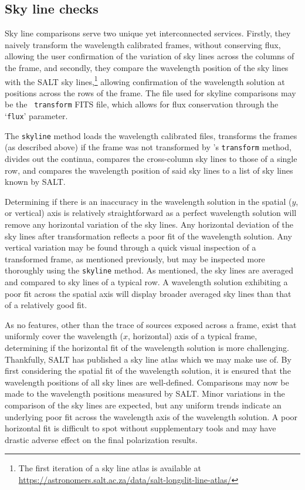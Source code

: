 \subsection{Sky line checks}\label{subsec:stops_skyline}


Sky line comparisons serve two unique yet interconnected services. Firstly, they naively transform the wavelength calibrated frames, without conserving flux, allowing the user confirmation of the variation of sky lines across the columns of the frame, and secondly, they compare the wavelength position of the sky lines with the \gls{SALT} sky lines,\footnote{The first iteration of a sky line atlas is available at \url{https://astronomers.salt.ac.za/data/salt-longslit-line-atlas/}} allowing confirmation of the wavelength solution at positions across the rows of the frame. The file used for skyline comparisons may be the \iraf\ \texttt{transform} \gls{FITS} file, which allows for flux conservation through the `\texttt{flux}' parameter.

The \texttt{skyline} method loads the wavelength calibrated files, transforms the frames (as described above) if the frame was not transformed by \iraf's \texttt{transform} method, divides out the continua, compares the cross-column sky lines to those of a single row, and compares the wavelength position of said sky lines to a list of sky lines known by \gls{SALT}.

Determining if there is an inaccuracy in the wavelength solution in the spatial ($y$, or vertical) axis is relatively straightforward as a perfect wavelength solution will remove any horizontal variation of the sky lines. Any horizontal deviation of the sky lines after transformation reflects a poor fit of the wavelength solution. Any vertical variation may be found through a quick visual inspection of a transformed frame, as mentioned previously, but may be inspected more thoroughly using the \texttt{skyline} method. As mentioned, the sky lines are averaged and compared to sky lines of a typical row. A wavelength solution exhibiting a poor fit across the spatial axis will display broader averaged sky lines than that of a relatively good fit.

As no features, other than the trace of sources exposed across a frame, exist that uniformly cover the wavelength ($x$, horizontal) axis of a typical frame, determining if the horizontal fit of the wavelength solution is more challenging. Thankfully, \gls{SALT} has published a sky line atlas which we may make use of. By first considering the spatial fit of the wavelength solution, it is ensured that the wavelength positions of all sky lines are well-defined. Comparisons may now be made to the wavelength positions measured by \gls{SALT}. Minor variations in the comparison of the sky lines are expected, but any uniform trends indicate an underlying poor fit across the wavelength axis of the wavelength solution. A poor horizontal fit is difficult to spot without supplementary tools and may have drastic adverse effect on the final polarization results.

